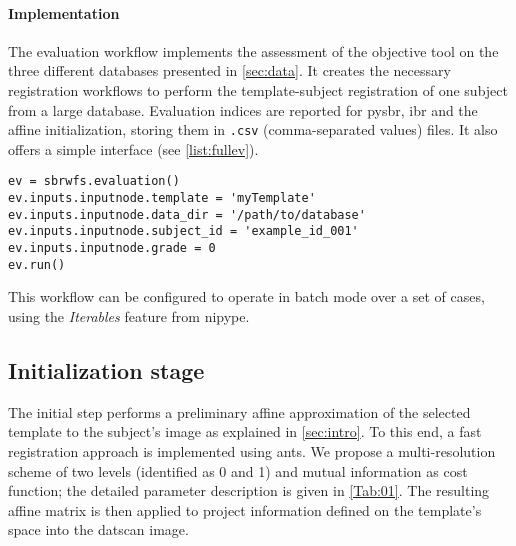 \documentclass{frontiers}
\begin{document}
\paragraph{Implementation} %
The evaluation workflow implements the assessment of the objective tool on the three different
  databases presented in \autoref{sec:data}. 
It creates the necessary registration workflows to perform the template-subject 
  registration of one subject from a large database.
Evaluation indices are reported for \gls*{pysbr}, \gls*{ibr} and the affine initialization,
  storing them in \texttt{.csv} (comma-separated values) files. 
It also offers a simple interface (see \autoref{list:fullev}).
\begin{lstlisting}[float,caption={\label{list:fullev}Running the evaluation pipeline}]
ev = sbrwfs.evaluation()
ev.inputs.inputnode.template = 'myTemplate'
ev.inputs.inputnode.data_dir = '/path/to/database'
ev.inputs.inputnode.subject_id = 'example_id_001'
ev.inputs.inputnode.grade = 0
ev.run()
\end{lstlisting}
\noindent 
This workflow can be configured to operate in batch mode over a
  set of cases, using the \emph{Iterables} feature from \gls*{nipype}.

\subsection{Initialization stage}
\label{sec:meth_initialization}
The initial step performs a preliminary affine approximation of the selected
  template to the subject's image as explained in \autoref{sec:intro}.
To this end, a fast registration approach is implemented using \gls*{ants}.
We propose a multi-resolution scheme of two levels (identified as 0 and 1) and 
  mutual information as cost function; the detailed parameter description 
  is given in \autoref{Tab:01}.
The resulting affine matrix is then applied to project information defined on
  the template's space into the \gls*{datscan} image.
\end{document}
